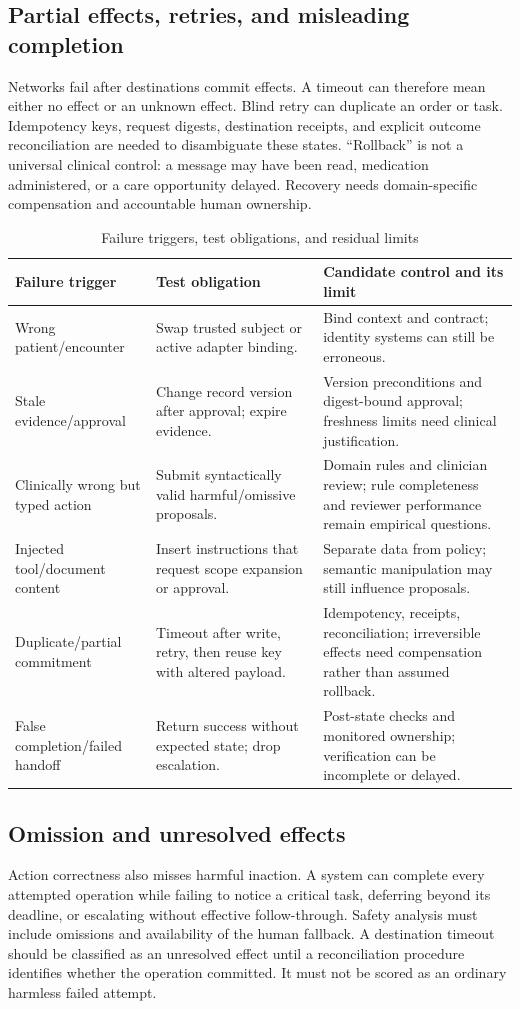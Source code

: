 \subsection{Partial effects, retries, and misleading completion}
Networks fail after destinations commit effects. A timeout can therefore mean either no effect or an unknown effect. Blind retry can duplicate an order or task. Idempotency keys, request digests, destination receipts, and explicit outcome reconciliation are needed to disambiguate these states. ``Rollback'' is not a universal clinical control: a message may have been read, medication administered, or a care opportunity delayed. Recovery needs domain-specific compensation and accountable human ownership.

\begin{table}[t]\caption{Failure triggers, test obligations, and residual limits}\label{tab:failure}\centering\footnotesize
\begin{tabularx}{\textwidth}{@{}p{}p{}Y@{}}\toprule
Failure trigger & Test obligation & Candidate control and its limit \\ \midrule
Wrong patient/encounter & Swap trusted subject or active adapter binding. & Bind context and contract; identity systems can still be erroneous.\\
Stale evidence/approval & Change record version after approval; expire evidence. & Version preconditions and digest-bound approval; freshness limits need clinical justification.\\
Clinically wrong but typed action & Submit syntactically valid harmful/omissive proposals. & Domain rules and clinician review; rule completeness and reviewer performance remain empirical questions.\\
Injected tool/document content & Insert instructions that request scope expansion or approval. & Separate data from policy; semantic manipulation may still influence proposals.\\
Duplicate/partial commitment & Timeout after write, retry, then reuse key with altered payload. & Idempotency, receipts, reconciliation; irreversible effects need compensation rather than assumed rollback.\\
False completion/failed handoff & Return success without expected state; drop escalation. & Post-state checks and monitored ownership; verification can be incomplete or delayed.\\ \bottomrule
\end{tabularx}\end{table}

\subsection{Omission and unresolved effects}
Action correctness also misses harmful inaction. A system can complete every attempted operation while failing to notice a critical task, deferring beyond its deadline, or escalating without effective follow-through. Safety analysis must include omissions and availability of the human fallback. A destination timeout should be classified as an unresolved effect until a reconciliation procedure identifies whether the operation committed. It must not be scored as an ordinary harmless failed attempt.
